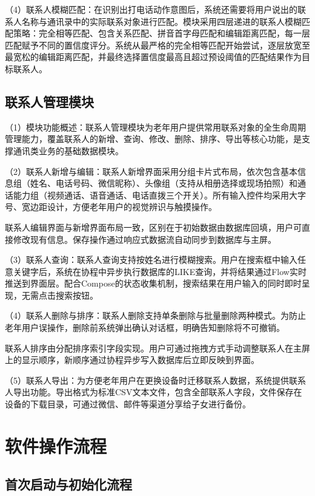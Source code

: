 （4）联系人模糊匹配：在识别出打电话动作意图后，系统还需要将用户说出的联系人名称与通讯录中的实际联系对象进行匹配。模块采用四层递进的联系人模糊匹配策略：完全相等匹配、包含关系匹配、拼音首字母匹配和编辑距离匹配，每一层匹配赋予不同的置信度评分。系统从最严格的完全相等匹配开始尝试，逐层放宽至最宽松的编辑距离匹配，并最终选择置信度最高且超过预设阈值的匹配结果作为目标联系人。



\subsection{联系人管理模块}
（1）模块功能概述：联系人管理模块为老年用户提供常用联系对象的全生命周期管理能力，覆盖联系人的新增、查询、修改、删除、排序、导出等核心功能，是支撑通讯类业务的基础数据模块。

（2）联系人新增与编辑：联系人新增界面采用分组卡片式布局，依次包含基本信息组（姓名、电话号码、微信昵称）、头像组（支持从相册选择或现场拍照）和通话能力组（视频通话、语音通话、电话直拨三个开关）。所有输入控件均采用大字号、宽边距设计，方便老年用户的视觉辨识与触摸操作。

联系人编辑界面与新增界面布局一致，区别在于初始数据由数据库回填，用户可直接修改现有信息。保存操作通过响应式数据流自动同步到数据库与主屏。

（3）联系人查询：联系人查询支持按姓名进行模糊搜索。用户在搜索框中输入任意关键字后，系统在协程中异步执行数据库的LIKE查询，并将结果通过Flow实时推送到界面层。配合Compose的状态收集机制，搜索结果在用户输入的同时即时呈现，无需点击搜索按钮。

（4）联系人删除与排序：联系人删除支持单条删除与批量删除两种模式。为防止老年用户误操作，删除前系统弹出确认对话框，明确告知删除将不可撤销。

联系人排序由分配排序索引字段实现。用户可通过拖拽方式手动调整联系人在主屏上的显示顺序，新顺序通过协程异步写入数据库后立即反映到界面。

（5）联系人导出：为方便老年用户在更换设备时迁移联系人数据，系统提供联系人导出功能。导出格式为标准CSV文本文件，包含全部联系人字段，文件保存在设备的下载目录，可通过微信、邮件等渠道分享给子女进行备份。

\section{软件操作流程}

\subsection{首次启动与初始化流程}

